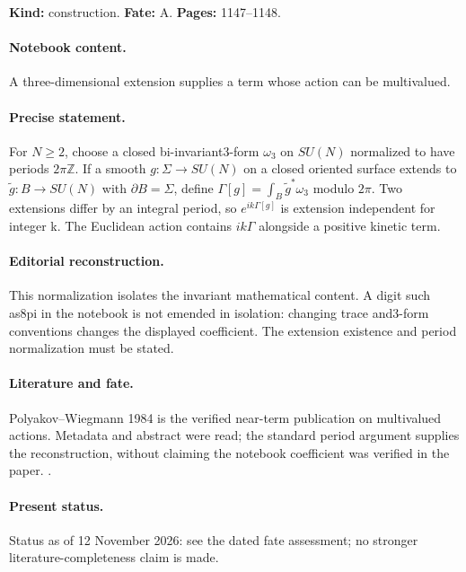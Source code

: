 \label{item:1983-616.4}

\noindent\textbf{Kind:} construction. \textbf{Fate:} A. \textbf{Pages:} 1147--1148.\par

\paragraph{Notebook content.} A three-dimensional extension supplies a term whose action can be multivalued.

\paragraph{Precise statement.} For $N\ge2$, choose a closed bi-invariant3-form $\omega_3$ on $SU(N)$ normalized to have periods $2\pi\mathbb Z$. If a smooth $g:\Sigma\to SU(N)$ on a closed oriented surface extends to $\widetilde g:B\to SU(N)$ with $\partial B=\Sigma$, define $\Gamma[g]=\int_B\widetilde g^*\omega_3$ modulo $2\pi$. Two extensions differ by an integral period, so $e^{ik\Gamma[g]}$ is extension independent for integer k. The Euclidean action contains $ik\Gamma$ alongside a positive kinetic term.

\paragraph{Editorial reconstruction.} This normalization isolates the invariant mathematical content. A digit such as8pi in the notebook is not emended in isolation: changing trace and3-form conventions changes the displayed coefficient. The extension existence and period normalization must be stated.

\paragraph{Literature and fate.} Polyakov--Wiegmann 1984 is the verified near-term publication on multivalued actions. Metadata and abstract were read; the standard period argument supplies the reconstruction, without claiming the notebook coefficient was verified in the paper. \citep{polyakovwiegmann1984multivalued}.

\paragraph{Present status.} Status as of 12 November 2026: see the dated fate assessment; no stronger literature-completeness claim is made.

